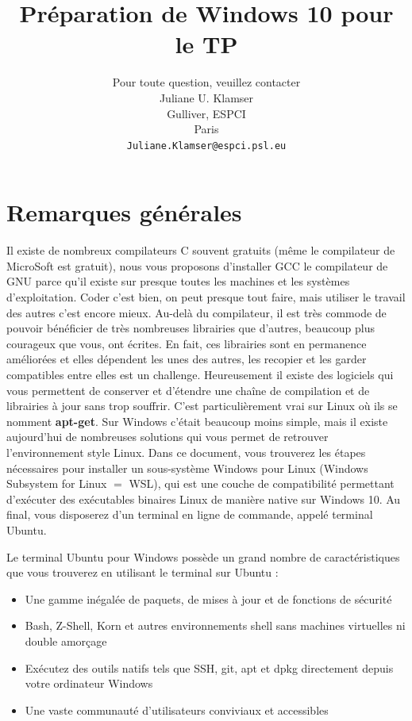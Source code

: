 \documentclass{article}
\title{Préparation de Windows 10 pour le TP}
\author{
Pour toute question, veuillez contacter\\
 Juliane U. Klamser\\%
  Gulliver,  ESPCI\\
  Paris \\
  \texttt{Juliane.Klamser@espci.psl.eu} \\
}
\begin{document}
\maketitle

\tableofcontents




\newpage
\section{Remarques générales}
Il existe de nombreux compilateurs C souvent gratuits (même le compilateur de MicroSoft est gratuit), nous vous proposons d'installer GCC le compilateur de GNU parce qu'il existe sur presque toutes les machines et les systèmes d'exploitation. Coder c'est bien, on peut presque tout faire, mais utiliser le travail des autres c'est encore mieux. Au-delà du compilateur, il est très commode de pouvoir bénéficier de très nombreuses librairies que d'autres, beaucoup plus courageux que vous, ont écrites. En fait, ces librairies sont en permanence améliorées et elles dépendent les unes des autres, les recopier et les garder compatibles entre elles est un challenge. 
Heureusement il existe des logiciels qui vous permettent de conserver et d'étendre une chaîne de compilation et de librairies à jour sans trop souffrir. C'est particulièrement vrai sur Linux où ils se nomment \textbf{apt-get}. Sur Windows c'était beaucoup moins simple, mais il existe aujourd'hui de nombreuses solutions qui vous permet de retrouver l’environnement style Linux. Dans ce document, vous trouverez les étapes nécessaires pour installer un sous-système Windows pour Linux (Windows Subsystem for Linux $=$ WSL), qui est une couche de compatibilité permettant d'exécuter des exécutables binaires Linux de manière native sur Windows 10.  Au final, vous disposerez d'un terminal en ligne de commande, appelé terminal Ubuntu.

Le terminal Ubuntu pour Windows possède un grand nombre de caractéristiques que vous trouverez en utilisant le terminal sur Ubuntu :
\begin{itemize}
\item Une gamme inégalée de paquets, de mises à jour et de fonctions de sécurité
\item Bash, Z-Shell, Korn et autres environnements shell sans machines virtuelles ni double amorçage
\item Exécutez des outils natifs tels que SSH, git, apt et dpkg directement depuis votre ordinateur Windows
\item Une vaste communauté d'utilisateurs conviviaux et accessibles
\end{itemize}
\end{document}
